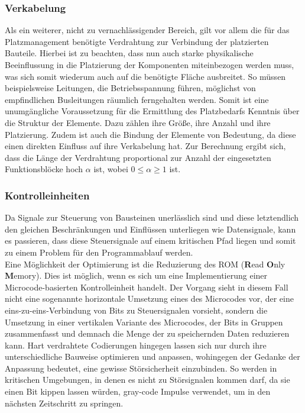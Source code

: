 \documentclass[conference]{IEEEtran}
\begin{document}
 \subsubsection{Verkabelung}
 Als ein weiterer, nicht zu vernachlässigender Bereich, gilt vor allem die für das Platzmanagement benötigte Verdrahtung zur Verbindung der platzierten Bauteile. Hierbei ist zu beachten, dass nun auch starke physikalische Beeinflussung in die Platzierung der Komponenten miteinbezogen werden muss, was sich somit wiederum auch auf die benötigte Fläche ausbreitet. So müssen beispielsweise Leitungen, die Betriebsspannung führen, möglichst von empfindlichen Busleitungen räumlich ferngehalten werden.
Somit ist eine unumgängliche Voraussetzung für die Ermittlung des Platzbedarfs Kenntnis über die Struktur der Elemente. Dazu zählen ihre Größe, ihre Anzahl und ihre Platzierung. Zudem ist auch die Bindung der Elemente von Bedeutung, da diese einen direkten Einfluss auf ihre Verkabelung hat.\cite[S.157]{3}
Zur Berechnung ergibt sich, dass die Länge der Verdrahtung proportional zur Anzahl der eingesetzten Funktionsblöcke hoch $\alpha$ ist, wobei $0 \leq \alpha \geq 1$ ist.\cite[S.157]{3}\\
 \subsubsection{Kontrolleinheiten}
Da Signale zur Steuerung von Bausteinen unerlässlich sind und diese letztendlich den gleichen Beschränkungen und Einflüssen unterliegen wie Datensignale, kann es passieren, dass diese Steuersignale auf einem kritischen Pfad liegen und somit zu einem Problem für den Programmablauf werden.\\
Eine Möglichkeit der Optimierung ist die Reduzierung des ROM (\textbf{R}ead \textbf{O}nly \textbf{M}emory). Dies ist möglich, wenn es sich um eine Implementierung einer Microcode-basierten Kontrolleinheit handelt. Der Vorgang sieht in diesem Fall nicht eine sogenannte horizontale Umsetzung eines des Microcodes vor, der eine eins-zu-eins-Verbindung von Bits zu Steuersignalen vorsieht, sondern die Umsetzung in einer vertikalen Variante des Microcodes, der Bits in Gruppen zusammenfasst und demnach die Menge der zu speichernden Daten reduzieren kann.
\cite[S.371-372]{2}
Hart verdrahtete Codierungen hingegen lassen sich nur durch ihre unterschiedliche Bauweise optimieren und anpassen, wohingegen der Gedanke der Anpassung bedeutet, eine gewisse Störsicherheit einzubinden. So werden in kritischen Umgebungen, in denen es nicht zu Störsignalen kommen darf, da sie einen Bit kippen lassen würden, gray-code Impulse verwendet, um in den nächsten Zeitschritt zu springen.\cite[S.373]{2}
\end{document}
